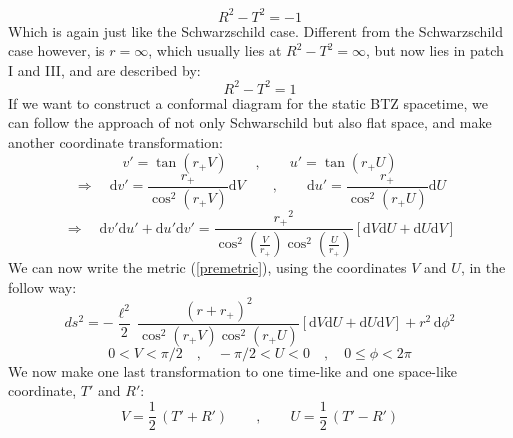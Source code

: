 \begin{equation}
R^2 - T^2 = -1
\end{equation}
%
%
%
Which is again just like the Schwarzschild case. Different from the Schwarzschild case however, is $r = \infty$, which usually lies at $R^2 - T^2 = \infty$, but now lies in patch I and III, and are described by:
%
%
\begin{equation}
R^2 - T^2 = 1
\end{equation}
%
%
%
If we want to construct a conformal diagram for the static BTZ spacetime, we can follow the approach of not only Schwarschild but also flat space, and make another coordinate transformation:
%
%
\begin{equation}
v' = \tan \left( r_+ V \right)
\qquad , \qquad
u' = \tan \left( r_+ U \right)
\end{equation}
%
%
\begin{equation}
\Rightarrow \quad
\mathrm{d} v' = \frac{r_+}{\cos^2(r_+ V)} \mathrm{d}V
\qquad , \qquad
\mathrm{d} u' = \frac{r_+}{\cos^2(r_+ U)} \mathrm{d}U
\end{equation}
%
%
\begin{equation}
\Rightarrow \quad
\mathrm{d} v' \mathrm{d} u' + \mathrm{d} u' \mathrm{d} v' =
\frac{{r_+}^2}{\cos^2(\frac{V}{r_+}) \cos^2(\frac{U}{r_+})} \left[ \mathrm{d}V \mathrm{d}U + \mathrm{d}U \mathrm{d}V \right]
\end{equation}
%
%
We can now write the metric (\ref{premetric}), using the coordinates $V$ and $U$, in the follow way:
%
%
\begin{equation}
ds^2 = - \frac{\ell^2}{2} \, \frac{(r + r_+)^2}{\cos^2(r_+ V) \cos^2(r_+ U)} \left[ \mathrm{d}V \mathrm{d}U + \mathrm{d}U \mathrm{d}V \right]
+ r^2  \, \mathrm{d}\phi^2
\end{equation}
%
\begin{equation*}
0 < V < \pi/2
\quad , \quad
-\pi/2 < U < 0
\quad , \quad
0 \leq \phi < 2 \pi
\end{equation*}
%
%
We now make one last transformation to one time-like and one space-like coordinate, $T'$ and $R'$:
%
%
\begin{equation}
V = \frac{1}{2} \, (T' + R')
\qquad , \qquad
U = \frac{1}{2} \, (T' - R')
\end{equation}
